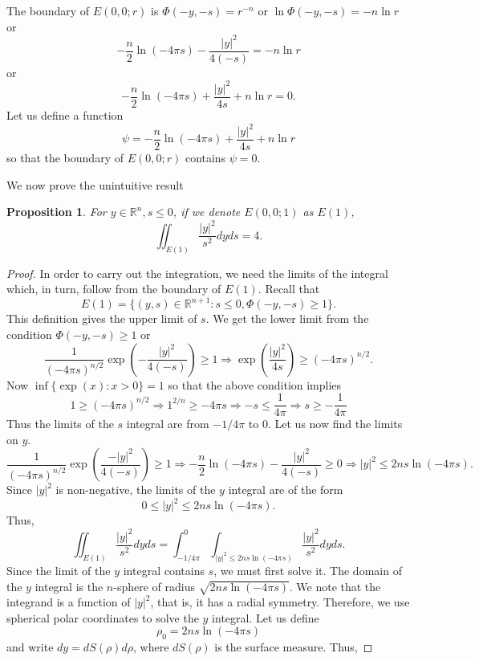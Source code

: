 \documentclass{article}
\theoremstyle{plain}
\numberwithin{thm}{section}
\theoremstyle{plain}
\newtheorem{prop}{Proposition}
\numberwithin{prop}{section}
\theoremstyle{definition}
\numberwithin{defn}{section}
\theoremstyle{remark}
\numberwithin{equation}{section}
\begin{document}
The boundary of $E(0, 0; r)$ is $\Phi(-y, -s) = r^{-n}$ or $\ln\Phi(-y, -s) = -n\ln r$ or
\[
-\frac{n}{2}\ln(-4\pi s) - \frac{|y|^2}{4(-s)} = -n \ln r
\]
or
\[
-\frac{n}{2}\ln(-4\pi s) + \frac{|y|^2}{4s} + n\ln r = 0.
\]
Let us define a function
\begin{equation}\label{s27e23}
\psi = -\frac{n}{2}\ln(-4\pi s) + \frac{|y|^2}{4s} + n\ln r
\end{equation}
so that the boundary of $E(0, 0; r)$ contains $\psi = 0$.

We now prove the unintuitive result
\begin{prop}\label{s27p5}
For $y \in \mathbb{R}^n, s \le 0$, if we denote $E(0, 0; 1)$ as $E(1)$,
\[
\iint_{E(1)}\frac{|y|^2}{s^2}dyds = 4.
\]
\end{prop}
\begin{proof}
In order to carry out the integration, we need the limits of the integral which, in turn, follow from the boundary
of $E(1)$. Recall that
\[
E(1) = \{(y, s) \in \mathbb{R}^{n+1} : s \le 0, \Phi(-y, -s) \ge 1\}.
\]
This definition gives the upper limit of $s$. We get the lower limit from the condition $\Phi(-y, -s) \ge 1$ or
\[
\frac{1}{(-4\pi s)^{n/2}}\exp\left(-\frac{|y|^2}{4(-s)}\right) \ge 1 \Rightarrow \exp\left(\frac{|y|^2}{4s}\right) 
\ge (-4\pi s)^{n/2}.
\]
Now $\inf\{\exp(x): x > 0\} = 1$ so that the above condition implies
\[
1 \ge (-4\pi s)^{n/2} \Rightarrow 1^{2/n} \ge -4\pi s \Rightarrow -s \le \frac{1}{4\pi} \Rightarrow s \ge 
-\frac{1}{4\pi}
\] 
Thus the limits of the $s$ integral are from $-1/4\pi$ to $0$. Let us now find the limits on $y$.
\[
\frac{1}{(-4\pi s)^{n/2}}\exp\left(\frac{-|y|^2}{4(-s)}\right) \ge 1 \Rightarrow -\frac{n}{2}\ln(-4\pi s) -
\frac{|y|^2}{4(-s)} \ge 0 \Rightarrow |y|^2 \le 2ns\ln(-4\pi s).
\]
Since $|y|^2$ is non-negative, the limits of the $y$ integral are of the form
\[
0 \le |y|^2 \le 2ns\ln(-4\pi s).
\]
Thus,
\[
\iint_{E(1)}\frac{|y|^2}{s^2}dyds = \int_{-1/4\pi}^0\int_{|y|^2 \le 2ns\ln(-4\pi s)}\frac{|y|^2}{s^2}dyds.
\]
Since the limit of the $y$ integral contains $s$, we must first solve it. The domain of the $y$ integral is the
$n$-sphere of radius $\sqrt{2ns\ln(-4\pi s)}$. We note that the integrand is a function of $|y|^2$, that is, it 
has a radial symmetry. Therefore, we use spherical polar coordinates to solve the $y$ integral. Let us define
\begin{equation}\label{s27e24}
\rho_0 = 2ns\ln(-4\pi s)
\end{equation}
and write $dy = dS(\rho)d\rho$, where $dS(\rho)$ is the surface measure. Thus,

\end{proof}
\end{document}
